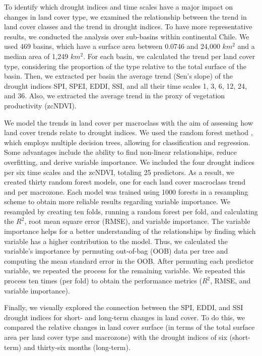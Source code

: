 \documentclass[
  authoryear,
  preprint,
  3p,
  onecolumn]{elsarticle}
\begin{document}
To identify which drought indices and time scales have a major impact on
changes in land cover type, we examined the relationship between the
trend in land cover classes and the trend in drought indices. To have
more representative results, we conducted the analysis over sub-basins
within continental Chile. We used 469 basins, which have a surface area
between 0.0746 and 24,000 \(km^2\) and a median area of 1,249 \(km^2\).
For each basin, we calculated the trend per land cover type, considering
the proportion of the type relative to the total surface of the basin.
Then, we extracted per basin the average trend (Sen's slope) of the
drought indices SPI, SPEI, EDDI, SSI, and all their time scales 1, 3, 6,
12, 24, and 36. Also, we extracted the average trend in the proxy of
vegetation productivity (zcNDVI).

We model the trends in land cover per macroclass with the aim of
assessing how land cover trends relate to drought indices. We used the
random forest method \citep{Ho1995}, which employs multiple decision
trees, allowing for classification and regression. Some advantages
include the ability to find non-linear relationships, reduce
overfitting, and derive variable importance. We included the four
drought indices per six time scales and the zcNDVI, totaling 25
predictors. As a result, we created thirty random forest models, one for
each land cover macroclass trend and per macrozone. Each model was
trained using 1000 forests in a resampling scheme to obtain more
reliable results regarding variable importance. We resampled by creating
ten folds, running a random forest per fold, and calculating the
\(R^2\), root mean square error (RMSE), and variable importance. The
variable importance helps for a better understanding of the
relationships by finding which variable has a higher contribution to the
model. Thus, we calculated the variable's importance by permuting
out-of-bag (OOB) data per tree and computing the mean standard error in
the OOB. After permuting each predictor variable, we repeated the
process for the remaining variable. We repeated this process ten times
(per fold) to obtain the performance metrics (\(R^2\), RMSE, and
variable importance).

Finally, we visually explored the connection between the SPI, EDDI, and
SSI drought indices for short- and long-term changes in land cover. To
do this, we compared the relative changes in land cover surface (in
terms of the total surface area per land cover type and macrozone) with
the drought indices of six (short-term) and thirty-six months
(long-term).
\end{document}

